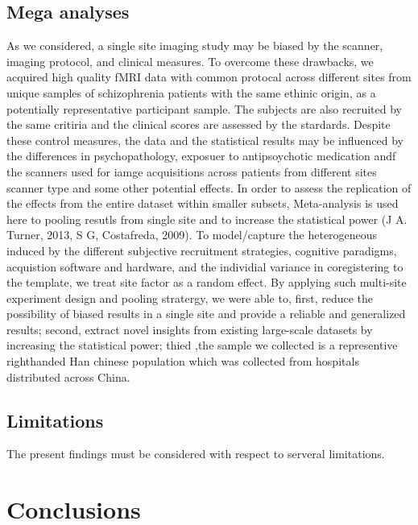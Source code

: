 \documentclass[preprint,authoryear,review,12pt,times]{elsarticle}
\begin{document}
\subsection*{Mega analyses}
As we considered, a single site imaging study may be biased by the scanner, imaging protocol, and clinical measures. To overcome these drawbacks, we acquired high quality fMRI data with common protocal across different sites from unique samples of schizophrenia patients with the same ethinic origin, as a potentially representative participant sample. The subjects are also recruited by the same critiria and the clinical scores are assessed by the stardards. Despite these control measures, the data and the statistical results may be influenced by the differences in psychopathology, exposuer to antipsoychotic medication andf the scanners used for iamge acquisitions across patients from different sites scanner type and some other potential effects. In order to assess the replication of the effects from the entire dataset within smaller subsets, Meta-analysis is used here to pooling resutls from single site and to increase the statistical power (J A. Turner, 2013, S G, Costafreda, 2009). To model/capture the heterogeneous induced by the different subjective recruitment strategies, cognitive paradigms, acquistion software and hardware, and the individial variance in coregistering to the template, we treat site factor as a random effect. By applying such multi-site experiment design and pooling stratergy, we were able to, first, reduce the possibility of biased results in a single site and provide a reliable and generalized results; second, extract novel insights from existing large-scale datasets by increasing the statistical power; thied ,the sample we collected is a representive righthanded Han chinese population which was collected from hospitals distributed across China.

\subsection*{Limitations}
The present findings must be considered with respect to serveral limitations. 

\section*{Conclusions}

\end{document}
